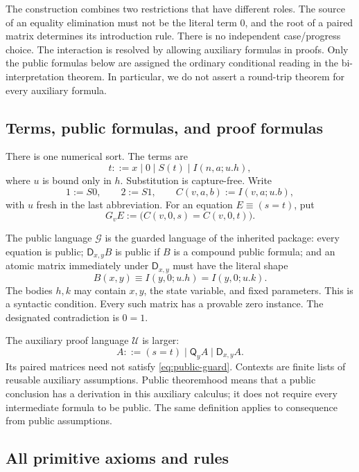 \documentclass[11pt,letterpaper]{article}
\theoremstyle{definition}
\newcommand{\D}{\mathsf D}
\newcommand{\Q}{\mathsf Q}
\newcommand{\G}{\mathcal G}
\newcommand{\U}{\mathcal U}
\begin{document}
The construction combines two restrictions that have different roles.  The
source of an equality elimination must not be the literal term $0$, and the
root of a paired matrix determines its introduction rule.  There is no
independent case/progress choice.  The interaction is resolved by allowing
auxiliary formulas in proofs.  Only the public formulas below are assigned
the ordinary conditional reading in the bi-interpretation theorem.  In
particular, we do not assert a round-trip theorem for every auxiliary
formula.

\subsection{Terms, public formulas, and proof formulas}

There is one numerical sort.  The terms are
\[
 t ::= x\mid 0\mid S(t)\mid I(n,a;u.h),
\]
where $u$ is bound only in $h$.  Substitution is capture-free.  Write
\[
 1:=S0,\qquad 2:=S1,\qquad C(v,a,b):=I(v,a;u.b),
\]
with $u$ fresh in the last abbreviation.  For an equation $E\equiv(s=t)$,
put
\[
 G_v E := \bigl(C(v,0,s)=C(v,0,t)\bigr).
\]

The public language $\G$ is the guarded language of the inherited package:
every equation is public; $\D_{x,y}B$ is public if $B$ is a compound public
formula; and an atomic matrix immediately under $\D_{x,y}$ must have the
literal shape
\begin{equation}
 B(x,y)\equiv I(y,0;u.h)=I(y,0;u.k).
 \tag{G}\label{eq:public-guard}
\end{equation}
The bodies $h,k$ may contain $x,y$, the state variable, and fixed
parameters.  This is a syntactic condition.  Every such matrix has a
provable zero instance.  The designated contradiction is $0=1$.

The auxiliary proof language $\U$ is larger:
\[
 A ::= (s=t)\mid\Q_y A\mid\D_{x,y}A.
\]
Its paired matrices need not satisfy \eqref{eq:public-guard}.  Contexts are
finite lists of reusable auxiliary assumptions.  Public theoremhood means
that a public conclusion has a derivation in this auxiliary calculus; it
does not require every intermediate formula to be public.  The same
definition applies to consequence from public assumptions.

\subsection{All primitive axioms and rules}
\end{document}
